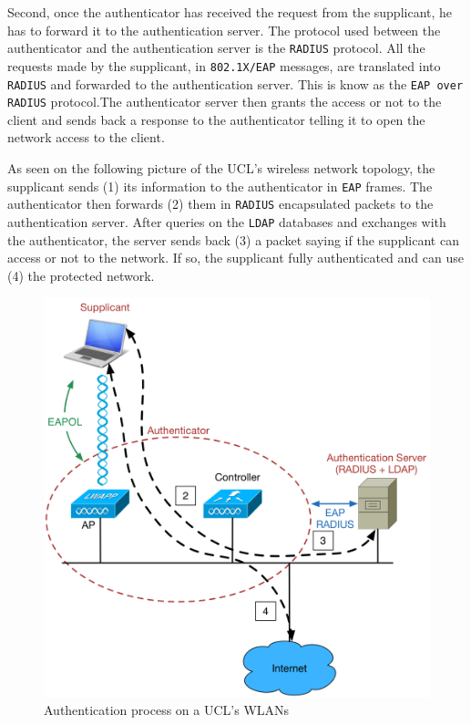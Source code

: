 Second, once the authenticator has received the request from the supplicant, he has to forward it to the authentication server. The protocol used between the authenticator and the authentication server is the \texttt{RADIUS} protocol. All the requests made by the supplicant, in \texttt{802.1X/EAP} messages, are translated into \texttt{RADIUS} and forwarded to the authentication server. This is know as the \texttt{EAP over RADIUS} protocol.The authenticator server then grants the access or not to the client and sends back a response to the authenticator telling it to open the network access to the client.

As seen on the following picture of the UCL's wireless network topology, the supplicant sends (1) its information to the authenticator in \texttt{EAP} frames. The authenticator then forwards (2) them in \texttt{RADIUS} encapsulated packets to the authentication server. After queries on the \texttt{LDAP} databases and exchanges with the authenticator, the server sends back (3) a packet saying if the supplicant can access or not to the network. If so, the supplicant fully authenticated and can use (4) the protected network.

\begin{figure}[H]
	\includegraphics[width=.9\linewidth]{Pictures/Chapter2/topology.png}
	\caption{Authentication process on a UCL's WLANs}
\end{figure}



